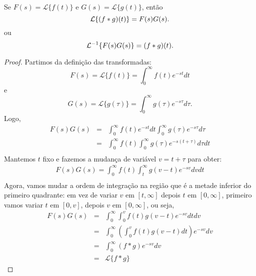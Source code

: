 \begin{propr}{\label{prop_conv}}Se $F(s)=\mathcal{L}\{f(t)\}$ e $G(s)=\mathcal{L}\{g(t)\}$, então
\begin{equation}{\label{eq_prop_conv}}
 \mathcal{L}\{(f*g)(t)\}=F(s)G(s).
\end{equation}
ou
\begin{equation}{\label{eq_inv_prop_conv}}
 \mathcal{L}^{-1}\{F(s)G(s)\}=(f*g)(t).
\end{equation}
\end{propr}
\begin{proof}Partimos da definição das transformadas:
$$
F(s)=\mathcal{L}\{f(t) \}=\int_0^\infty f(t)e^{-st}dt
$$
e
$$
G(s)=\mathcal{L}\{g(\tau) \}=\int_0^\infty g(\tau)e^{-s\tau}d\tau.
$$
Logo,
\begin{eqnarray*}
 F(s)G(s)&=&\int_0^\infty f(t)e^{-st}dt\int_0^\infty g(\tau)e^{-s\tau}d\tau\\
&=&\int_0^\infty f(t) \int_0^\infty g(\tau)e^{-s(t+\tau)} d\tau dt\\
\end{eqnarray*}
Mantemos $t$ fixo e fazemos a mudança de variável $v=t+\tau$ para obter:
\begin{eqnarray*}
 F(s)G(s)=\int_0^\infty f(t) \int_t^\infty g(v-t)e^{-sv}dv dt\\
\end{eqnarray*}
Agora, vamos mudar a ordem de integração na região que é a metade inferior do primeiro quadrante: em vez de variar $v$ em $[t,\infty]$ depois $t$ em $[0,\infty]$, primeiro vamos variar $t$ em $[0,v]$, depois $v$ em $[0,\infty]$, ou seja,
\begin{eqnarray*}
 F(s)G(s)&=&\int_0^\infty  \int_0^v f(t) g(v-t)e^{-sv} dt dv\\
 &=&\int_0^\infty \left( \int_0^v f(t) g(v-t)dt\right)e^{-sv}  dv\\
 &=&\int_0^\infty (f*g)e^{-sv}  dv\\
   &=&\mathcal{L}\{f*g\}
\end{eqnarray*}
\end{proof}

